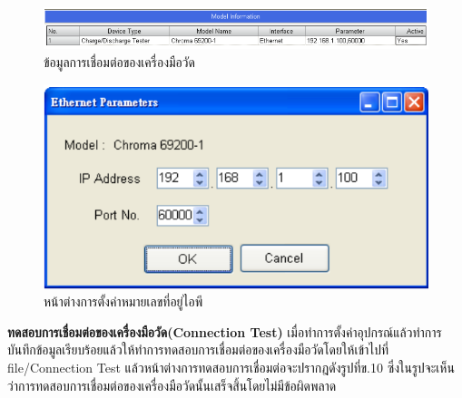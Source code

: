 \begin{center}
	\begin{figure}[H]
		\includegraphics[width=1\linewidth]{Chapters/img/17020_Program/HW_Configulation/Model_info.png}
		\centering
		\captionsetup{justification=centering,margin=2cm}
		\caption{ข้อมูลการเชื่อมต่อของเครื่องมือวัด}
	\end{figure}
	\begin{figure}[H]
		\includegraphics[width=1\linewidth]{Chapters/img/17020_Program/HW_Configulation/IP_Address.png}
		\centering
		\captionsetup{justification=centering,margin=2cm}
		\caption{หน้าต่างการตั้งค่าหมายเลขที่อยู่ไอพี}
	\end{figure}
\end{center}
\textbf{ทดสอบการเชื่อมต่อของเครื่องมือวัด(Connection Test)}
\newline \hspace*{2cm}
เมื่อทำการตั้งค่าอุปกรณ์แล้วทำการบันทึกข้อมูลเรียบร้อยแล้วให้ทำการทดสอบการเชื่อมต่อของเครื่องมือวัดโดยให้เข้าไปที่ file/Connection Test แล้วหน้าต่างการทดสอบการเชื่อมต่อจะปรากฎดังรูปที่ข.10
ซึ่งในรูปจะเห็นว่าการทดสอบการเชื่อมต่อของเครื่องมือวัดนั้นเสร็จสิ้นโดยไม่มีข้อผิดพลาด

